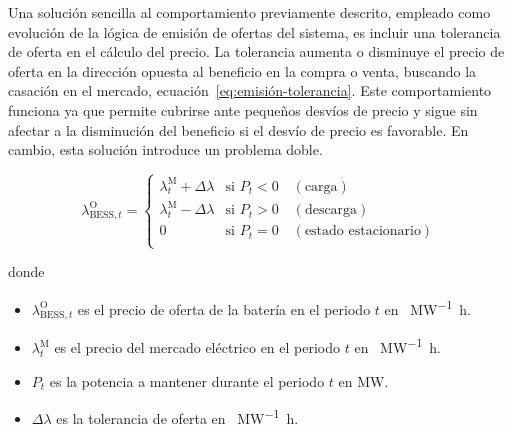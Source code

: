 Una solución sencilla al comportamiento previamente descrito, empleado como evolución de la lógica de emisión de ofertas del sistema, es incluir una tolerancia de oferta en el cálculo del precio. La tolerancia aumenta o disminuye el precio de oferta en la dirección opuesta al beneficio en la compra o venta, buscando la casación en el mercado, ecuación~\ref{eq:emisión-tolerancia}. Este comportamiento funciona ya que permite cubrirse ante pequeños desvíos de precio y sigue sin afectar a la disminución del beneficio si el desvío de precio es favorable. En cambio, esta solución introduce un problema doble.

\begin{samepage}

  \begin{equation}%
    \label{eq:emisión-tolerancia}
    \lambda^{\mathrm{O}}_{\mathrm{BESS}, t} =
    \begin{cases}
      \lambda^{\mathrm{M}}_{t} + \Delta \lambda & \text{si } P_{t} < 0 \quad (\text{carga})               \\
      \lambda^{\mathrm{M}}_{t} - \Delta \lambda & \text{si } P_{t} > 0 \quad (\text{descarga})            \\
      0                                         & \text{si } P_{t} = 0 \quad (\text{estado estacionario}) \\
    \end{cases}
  \end{equation}

  donde

  \begin{itemize}

    \item \( \lambda^{\mathrm{O}}_{\mathrm{BESS}, t} \) es el precio de oferta de la batería en el periodo \( t \) en \si{\text{\euro}\per\mega\watt\hour}.

    \item \( \lambda^{\mathrm{M}}_{t} \) es el precio del mercado eléctrico en el periodo \( t \) en \si{\text{\euro}\per\mega\watt\hour}.

    \item \( P_{t} \) es la potencia a mantener durante el periodo \( t \) en \si{\mega\watt}.

    \item \( \Delta \lambda \) es la tolerancia de oferta en \si{\text{\euro}\per\mega\watt\hour}.

  \end{itemize}

\end{samepage}

